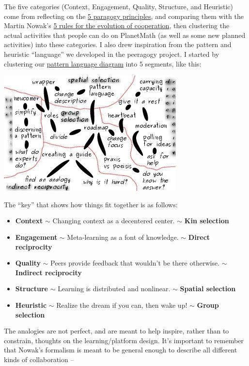 The five categories (Context, Engagement, Quality, Structure, and
Heuristic) come from reflecting on the \href{http://paragogy.net}{5
paragogy principles}, and comparing them with the Martin Nowak's
\href{http://www.sciencemag.org/content/314/5805/1560.full}{5 rules for
the evolution of cooperation}, then clustering the actual activities
that people can do on PlanetMath (as well as some new planned
activities) into these categories. I also drew inspiration from the
pattern and heuristic ``language'' we developed in the peeragogy
project. I started by clustering our
\href{http://peeragogy.org/patterns-usecases/patterns-and-heuristics/}{pattern
language diagram} into 5 segments, like this:

\begin{center}
\includegraphics[width=.9\textwidth]{./pictures/subway-redline.jpg} 
\end{center}

The ``key'' that shows how things fit together is as follows:

\begin{itemize}
\item
  \textbf{Context} \ensuremath{\sim} Changing context as a decentered
  center. \ensuremath{\sim} \textbf{Kin selection}
\item
  \textbf{Engagement} \ensuremath{\sim} Meta-learning as a font of
  knowledge. \ensuremath{\sim} \textbf{Direct reciprocity}
\item
  \textbf{Quality} \ensuremath{\sim} Peers provide feedback that
  wouldn't be there otherwise. \ensuremath{\sim} \textbf{Indirect
  reciprocity}
\item
  \textbf{Structure} \ensuremath{\sim} Learning is distributed and
  nonlinear. \ensuremath{\sim} \textbf{Spatial selection}
\item
  \textbf{Heuristic} \ensuremath{\sim} Realize the dream if you can,
  then wake up! \ensuremath{\sim} \textbf{Group selection}
\end{itemize}
The analogies are not perfect, and are meant to help inspire, rather
than to constrain, thoughts on the learning/platform design. It's
important to remember that Nowak's formalism is meant to be general
enough to describe all different kinds of collaboration --

